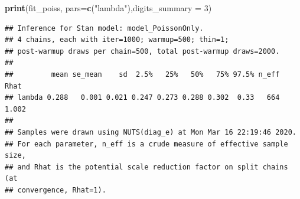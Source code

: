 \documentclass[]{article}
\newenvironment{Shaded}{\begin{snugshade}}{\end{snugshade}}
\newcommand{\CommentTok}[1]{\textcolor[rgb]{0.56,0.35,0.01}{\textit{#1}}}
\newcommand{\DataTypeTok}[1]{\textcolor[rgb]{0.13,0.29,0.53}{#1}}
\newcommand{\DecValTok}[1]{\textcolor[rgb]{0.00,0.00,0.81}{#1}}
\newcommand{\KeywordTok}[1]{\textcolor[rgb]{0.13,0.29,0.53}{\textbf{#1}}}
\newcommand{\NormalTok}[1]{#1}
\newcommand{\OperatorTok}[1]{\textcolor[rgb]{0.81,0.36,0.00}{\textbf{#1}}}
\newcommand{\StringTok}[1]{\textcolor[rgb]{0.31,0.60,0.02}{#1}}
\begin{document}
\begin{Shaded}
\end{Shaded}

\begin{Shaded}
\begin{Highlighting}[]
\KeywordTok{print}\NormalTok{(fit_poiss, }\DataTypeTok{pars=}\KeywordTok{c}\NormalTok{(}\StringTok{"lambda"}\NormalTok{),}\DataTypeTok{digits_summary =} \DecValTok{3}\NormalTok{)}
\end{Highlighting}
\end{Shaded}

\begin{verbatim}
## Inference for Stan model: model_PoissonOnly.
## 4 chains, each with iter=1000; warmup=500; thin=1; 
## post-warmup draws per chain=500, total post-warmup draws=2000.
## 
##         mean se_mean    sd  2.5%   25%   50%   75% 97.5% n_eff  Rhat
## lambda 0.288   0.001 0.021 0.247 0.273 0.288 0.302  0.33   664 1.002
## 
## Samples were drawn using NUTS(diag_e) at Mon Mar 16 22:19:46 2020.
## For each parameter, n_eff is a crude measure of effective sample size,
## and Rhat is the potential scale reduction factor on split chains (at 
## convergence, Rhat=1).
\end{verbatim}
\end{document}
